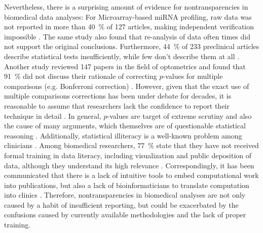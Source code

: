 Nevertheless, there is a surprising amount of evidence for nontransparencies in
biomedical data analyses: For Microarray-based miRNA profiling, raw data was not
reported in more than \SI{40}{\percent} of 127 articles, making independent
verification impossible \cite{witwerDataSubmissionQuality2013}. The same study
also found that re-analysis of data often times did not support the original
conclusions. Furthermore, \SI{44}{\percent} of 233 preclinical articles describe
statistical tests insufficiently, while few don't describe them at all
\cite{gosselinInsufficientTransparencyStatistical2021}. Another study reviewed
147 papers in the field of optometrics and found that \SI{91}{\percent} did not
discuss their rationale of correcting $p$-values for multiple comparisons (e.g.
Bonferroni correction) \cite{armstrongWhenUseBonferroni2014}. However, given
that the exact use of multiple comparisons corrections has been under debate for
decades, it is reasonable to assume that researchers lack the confidence to
report their technique in detail \cite{pernegerWhatWrongBonferroni1998,
    moranArgumentsRejectingSequential2003, sullivanFactsFictionsHandling2021}. In
general, $p$-values are target of extreme scrutiny and also the cause of many
arguments, which themselves are of questionable statistical reasoning%
%
\cite{leekStatisticsValuesAre2015}. Additionally, statistical illiteracy is a
well-known problem among clinicians
\cite{lakhlifiIllusionKnowledgeStatistics2023}. Among biomedical researchers,
\SI{77}{\percent} state that they have not received formal training in data
literacy, including visualization and public deposition of data, although they
understand its high relevance \cite{federerDataLiteracyTraining2016}.
Correspondingly, it has been communicated that there is a lack of intuitive
tools to embed computational work into publications, but also a lack of
bioinformaticians to translate computation into clinics
\cite{mesirovAccessibleReproducibleResearch2010, smithJournalOpenSource2018,gomez-lopezPrecisionMedicineNeeds2019}.
Therefore, nontransparencies in biomedical analyses are not only caused by a
habit%
%
of insufficient reporting, but could be exacerbated by the confusions caused
by currently available methodologies and the lack of proper training.



